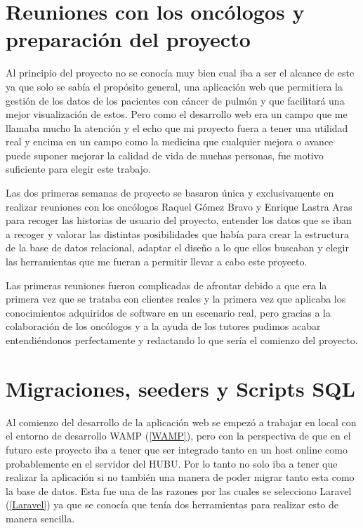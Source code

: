 
\section{Reuniones con los oncólogos y preparación del proyecto}

Al principio del proyecto no se conocía muy bien cual iba a ser el alcance de este ya que solo se sabía el propósito general, una aplicación web que permitiera la gestión de los datos de los pacientes con cáncer de pulmón y que facilitará una mejor visualización de estos. Pero como el desarrollo web era un campo que me llamaba mucho la atención y el echo que mi proyecto fuera a tener una utilidad real y encima en un campo como la medicina que cualquier mejora o avance puede suponer mejorar la calidad de vida de muchas personas, fue motivo suficiente para elegir este trabajo.

Las dos primeras semanas de proyecto se basaron única y exclusivamente en realizar reuniones con los oncólogos Raquel Gómez Bravo y Enrique Lastra Aras para recoger las historias de usuario del proyecto, entender los datos que se iban a recoger y valorar las distintas posibilidades que había para crear la estructura de la base de datos relacional, adaptar el diseño a lo que ellos buscaban y elegir las herramientas que me fueran a permitir llevar a cabo este proyecto.

Las primeras reuniones fueron complicadas de afrontar debido a que era la primera vez que se trataba con clientes reales y la primera vez que aplicaba los conocimientos adquiridos de software en un escenario real, pero gracias a la colaboración de los oncólogos y a la ayuda de los tutores pudimos acabar entendiéndonos perfectamente y redactando lo que sería el comienzo del proyecto. 

\section{Migraciones, seeders y Scripts SQL}

Al comienzo del desarrollo de la aplicación web se empezó a trabajar en local con el entorno de desarrollo WAMP (\ref{WAMP}), pero con la perspectiva de que en el futuro este proyecto iba a tener que ser integrado tanto en un host online como probablemente en el servidor del HUBU. Por lo tanto no solo iba a tener que realizar la aplicación si no también una manera de poder migrar tanto esta como la base de datos. Esta fue una de las razones por las cuales se selecciono Laravel (\ref{Laravel}) ya que se conocía que tenía dos herramientas para realizar esto de manera sencilla.

